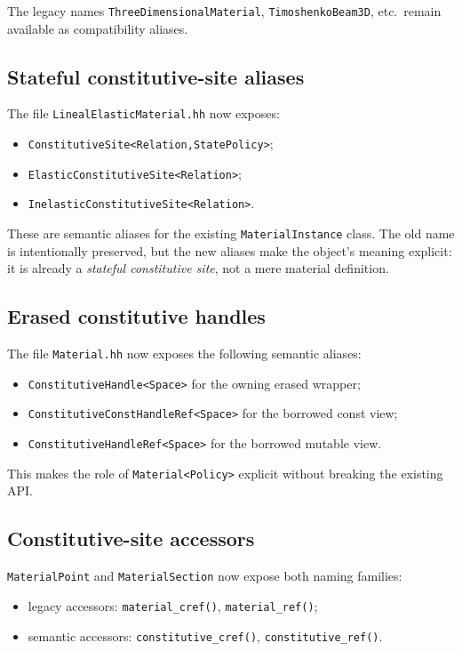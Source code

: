The legacy names \texttt{ThreeDimensionalMaterial},
\texttt{TimoshenkoBeam3D}, etc.\ remain available as compatibility aliases.

\subsection{Stateful constitutive-site aliases}

The file \texttt{LinealElasticMaterial.hh} now exposes:
\begin{itemize}
  \item \texttt{ConstitutiveSite<Relation,StatePolicy>};
  \item \texttt{ElasticConstitutiveSite<Relation>};
  \item \texttt{InelasticConstitutiveSite<Relation>}.
\end{itemize}

These are semantic aliases for the existing \texttt{MaterialInstance} class.
The old name is intentionally preserved, but the new aliases make the object's
meaning explicit: it is already a \emph{stateful constitutive site}, not a
mere material definition.

\subsection{Erased constitutive handles}

The file \texttt{Material.hh} now exposes the following semantic aliases:
\begin{itemize}
  \item \texttt{ConstitutiveHandle<Space>} for the owning erased wrapper;
  \item \texttt{ConstitutiveConstHandleRef<Space>} for the borrowed const view;
  \item \texttt{ConstitutiveHandleRef<Space>} for the borrowed mutable view.
\end{itemize}

This makes the role of \texttt{Material<Policy>} explicit without breaking the
existing API.

\subsection{Constitutive-site accessors}

\texttt{MaterialPoint} and \texttt{MaterialSection} now expose both naming
families:
\begin{itemize}
  \item legacy accessors: \texttt{material\_cref()}, \texttt{material\_ref()};
  \item semantic accessors: \texttt{constitutive\_cref()},
        \texttt{constitutive\_ref()}.
\end{itemize}

